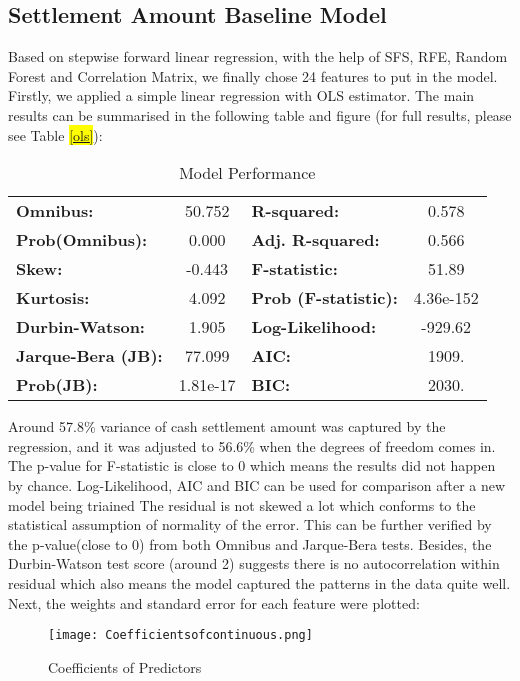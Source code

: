 \subsection{Settlement Amount Baseline Model}
Based on stepwise forward linear regression, with the help of SFS, RFE, Random Forest and Correlation Matrix, we finally chose 24 features to put in the model. Firstly, we applied a simple linear regression with OLS estimator. The main results can be summarised in the following table and figure (for full results, please see Table \hl{\ref{ols}}):
\begin{table} [H]
\caption{Model Performance}
\centering
\begin{tabular}{lclc}
\toprule
\textbf{Omnibus:}       & 50.752 & \textbf{  R-squared:         } &     0.578   \\
\textbf{Prob(Omnibus):} &  0.000         & \textbf{  Adj. R-squared:    } &     0.566   \\
\textbf{Skew:}          & -0.443     & \textbf{  F-statistic:       } &     51.89   \\
\textbf{Kurtosis:}      &  4.092   & \textbf{  Prob (F-statistic):} & 4.36e-152   \\
\textbf{  Durbin-Watson:     } &    1.905       & \textbf{  Log-Likelihood:    } &   -929.62   \\
 \textbf{  Jarque-Bera (JB):  } &   77.099        & \textbf{  AIC:               } &     1909.   \\
 \textbf{  Prob(JB):          } & 1.81e-17        & \textbf{  BIC:               } &     2030.   \\
\bottomrule
\end{tabular}
\end{table}
Around 57.8\% variance of cash settlement amount was captured by the regression, and it was adjusted to 56.6\% when the degrees of freedom comes in. The p-value for F-statistic is close to 0 which means the results did not happen by chance. Log-Likelihood, AIC and BIC can be used for comparison after a new model being triained The residual is not skewed a lot which conforms to the statistical assumption of normality of the error. This can be further verified by the p-value(close to 0) from both Omnibus and Jarque-Bera tests. Besides, the Durbin-Watson test score (around 2) suggests there is no autocorrelation within residual which also means the model captured the patterns in the data quite well. Next, the weights and standard error for each feature were plotted:
\begin{figure}[H]
  \centering
  \texttt{[image: Coefficientsofcontinuous.png]}
  \caption{Coefficients of Predictors}
\end{figure}
